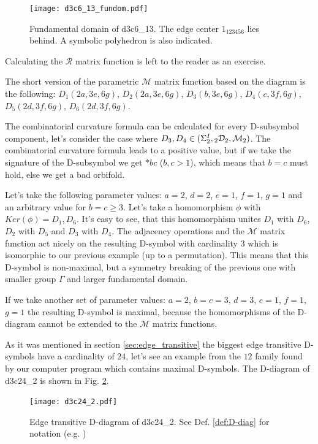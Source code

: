 \documentclass[12pt,a4paper]{article}
\numberwithin{equation}{section}
\newcommand{\leftsub}[2]{{\vphantom{#2}}_{#1}{#2}}
\theoremstyle{plain}%
\theoremstyle{definition}
\theoremstyle{remark}
\begin{document}
\begin{figure}
  \caption{\label{fig:d3c6_13_fundom} Fundamental domain of d3c6\_13. The edge
  center $1_{123456}$ lies behind. A symbolic polyhedron is also indicated.}
  \center
  \texttt{[image: d3c6\_13\_fundom.pdf]}
\end{figure}

Calculating the $\mathcal{R}$ matrix function is left to the reader as an
exercise.

The short version of the parametric $\mathcal{M}$ matrix function based on the
diagram is the following: $D_1(2a, 3e, 6g)$, $D_2(2a, 3e, 6g)$, $D_3(b, 3e,
6g)$, $D_4(c, 3f, 6g)$, $D_5(2d, 3f, 6g)$, $D_6(2d, 3f, 6g)$.

The combinatorial curvature formula can be calculated for every D-subsymbol
component,
let's consider the case where
$D_3,D_4\in(\Sigma^I_2,\leftsub{2}{\mathcal{D}}_2,\mathcal{M}_2)$. The combinatorial
curvature formula leads to a positive value, but if we take the signature of
the D-subsymbol we get $*bc$ ($b,c>1$), which means that $b=c$ must hold, else
we get a bad orbifold.

Let's take the following parameter values: $a=2$, $d=2$, $e=1$, $f=1$, $g=1$ and
an arbitrary value for $b=c\geq3$. Let's take a homomorphism $\phi$ with
$Ker(\phi)={D_1,D_6}$. It's easy to see, that this homomorphism unites $D_1$
with $D_6$, $D_2$ with $D_5$ and $D_3$ with $D_4$. The adjacency operations and
the $\mathcal{M}$ matrix function act nicely on the resulting D-symbol
with cardinality $3$ which is isomorphic to our previous example (up to a
permutation). This means that this D-symbol is non-maximal, but a symmetry
breaking of the previous one with smaller group $\Gamma$ and larger fundamental
domain.

If we take another set of parameter values: $a=2$, $b=c=3$, $d=3$, $e=1$,
$f=1$, $g=1$ the resulting D-symbol is maximal, because the homomorphisms of the
D-diagram cannot be extended to the $\mathcal{M}$ matrix functions.

As it was mentioned in section \ref{sec:edge_transitive} the biggest edge
transitive D-symbols have a cardinality of $24$, let's see an example from the
$12$ family found by our computer program which contains maximal D-symbols.
The D-diagram of d3c24\_2 is shown in Fig. \ref{fig:d3c24_2}.

\begin{figure}
  \caption{\label{fig:d3c24_2} Edge transitive D-diagram of d3c24\_2. See
  Def. \ref{def:D-diag} for notation (e.g. \usebox{\LegendBody})}
  \center
  \texttt{[image: d3c24\_2.pdf]}
\end{figure}
\end{document}
